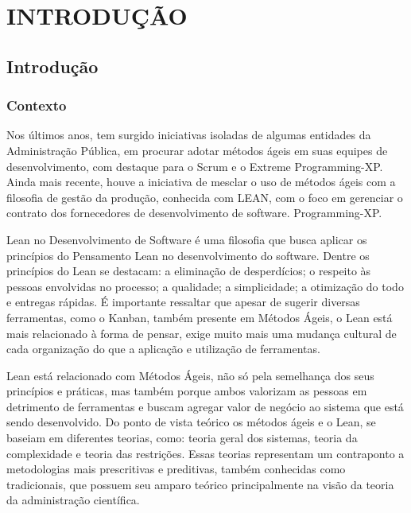 \part{INTRODUÇÃO}

\chapter[Introdução]{Introdução}



\section[Contexto]{Contexto}

Nos últimos anos, tem surgido iniciativas isoladas de algumas entidades da Administração Pública, em procurar adotar métodos ágeis em suas equipes de desenvolvimento, com destaque para o Scrum e o Extreme Programming-XP. 
\textcolor{red}{}
Ainda mais recente, houve a iniciativa de mesclar o uso de métodos ágeis com a filosofia de gestão da produção, conhecida com LEAN, com o foco em gerenciar o contrato dos fornecedores de desenvolvimento de software. Programming-XP.
\textcolor{red}{}

Lean no Desenvolvimento de Software é uma filosofia que busca aplicar os princípios do Pensamento Lean no desenvolvimento do software. Dentre os princípios do Lean se destacam: a eliminação de desperdícios; o respeito às pessoas envolvidas no processo; a qualidade; a simplicidade; a otimização do todo e entregas rápidas.
\textcolor{red}{}
É importante ressaltar que apesar de sugerir diversas ferramentas, como o Kanban, também presente em Métodos Ágeis, o Lean está mais relacionado à forma de pensar, exige muito mais uma mudança cultural de cada organização do que a aplicação e utilização de ferramentas. 

Lean está relacionado com Métodos Ágeis, não só pela semelhança dos seus princípios e práticas, mas também porque ambos valorizam as pessoas em detrimento de ferramentas e buscam agregar valor de negócio ao sistema que está sendo desenvolvido. Do ponto de vista teórico os métodos ágeis e o Lean, se baseiam em diferentes teorias, como: teoria geral dos sistemas, teoria da complexidade e teoria das restrições. 
\textcolor{red}{}
Essas teorias representam um contraponto a metodologias mais prescritivas e preditivas, também conhecidas como tradicionais, que possuem seu amparo teórico principalmente na visão da teoria da administração científica.
\textcolor{red}{}

